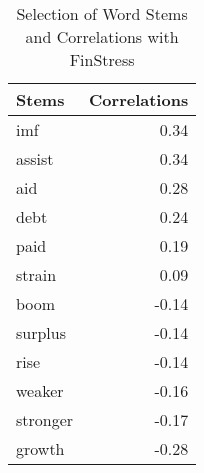 \begin{table}[ht]
\centering
\caption{Selection of Word Stems and Correlations with FinStress} 
\label{stem_correlations}
\begin{tabular}{lr}
  \hline
Stems & Correlations \\
  \hline
imf & 0.34 \\
  assist & 0.34 \\
  aid & 0.28 \\
  debt & 0.24 \\
  paid & 0.19 \\
  strain & 0.09 \\
  boom & -0.14 \\
  surplus & -0.14 \\
  rise & -0.14 \\
  weaker & -0.16 \\
  stronger & -0.17 \\
  growth & -0.28 \\
   \hline
\end{tabular}
\end{table}
